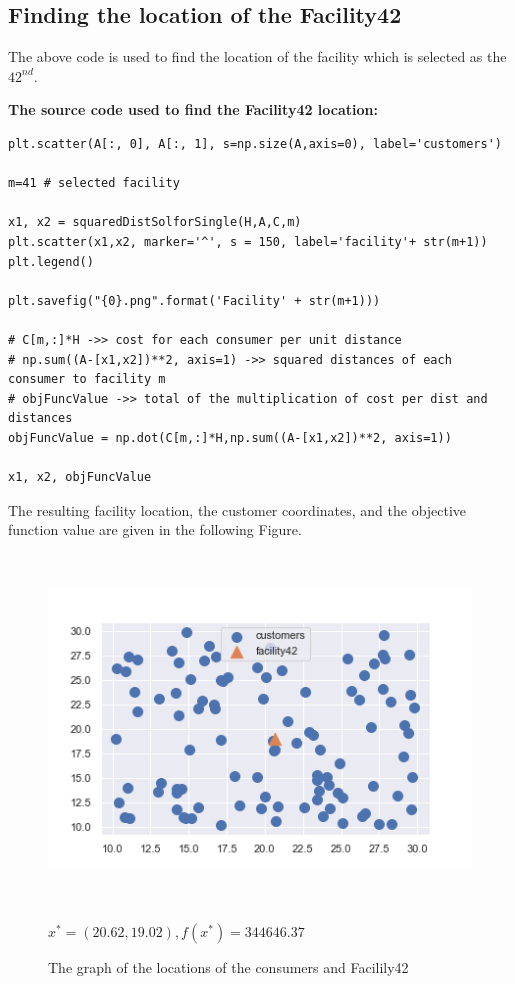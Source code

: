 \documentclass[12pt]{article}
\begin{document}
\subsection{Finding the location of the Facility42}
The above code is used to find the location of the facility which is selected as the $42^{nd}$. 

\textbf{The source code used to find the Facility42 location:}
\begin{lstlisting}[style=pythonstyle]
plt.scatter(A[:, 0], A[:, 1], s=np.size(A,axis=0), label='customers')

m=41 # selected facility

x1, x2 = squaredDistSolforSingle(H,A,C,m)
plt.scatter(x1,x2, marker='^', s = 150, label='facility'+ str(m+1))
plt.legend()

plt.savefig("{0}.png".format('Facility' + str(m+1)))
 
# C[m,:]*H ->> cost for each consumer per unit distance
# np.sum((A-[x1,x2])**2, axis=1) ->> squared distances of each consumer to facility m
# objFuncValue ->> total of the multiplication of cost per dist and distances
objFuncValue = np.dot(C[m,:]*H,np.sum((A-[x1,x2])**2, axis=1))

x1, x2, objFuncValue

\end{lstlisting}

The resulting facility location, the customer coordinates, and the objective function value are given in the following Figure.
\begin{figure}[ht] 
    \centering
    \includegraphics[height=25em]{Facility42.png}
    \caption{The graph of the locations of the consumers and Facilily42}
    \begin{center}
        \textit{$x^*=(20.62, 19.02), f(x^*)=344646.37$}
    \end{center}
\end{figure}
\FloatBarrier
\end{document}
